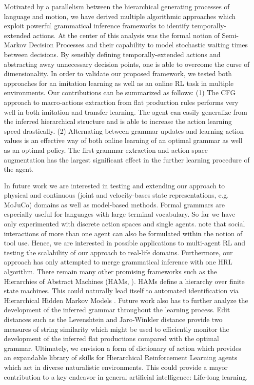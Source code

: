 \documentclass[colorinlistoftodos]{article}
\theoremstyle{definition}
\begin{document}
Motivated by a parallelism between the hierarchical generating processes of language and motion, we have derived multiple algorithmic approaches which exploit powerful grammatical inference frameworks to identify temporally-extended actions. At the center of this analysis was the formal notion of Semi-Markov Decision Processes and their capability to model stochastic waiting times between decisions. By sensibly defining temporally-extended actions and abstracting away unnecessary decision points, one is able to overcome the curse of dimensionality. 
In order to validate our proposed framework, we tested both approaches for an imitation learning as well as an online RL task in multiple environments. Our contributions can be summarized as follows:
%
(1) The CFG approach to macro-actions extraction from flat production rules performs very well in both imitation and transfer learning. The agent can easily generalize from the inferred hierarchical structure and is able to increase the action learning speed drastically.
%
(2) Alternating between grammar updates and learning action values is an effective way of both online learning of an optimal grammar as well as an optimal policy. The first grammar extraction and action space augmentation has the largest significant effect in the further learning procedure of the agent. 

In future work we are interested in testing and extending our approach to physical and continuous (joint and velocity-bases state representations, e.g. MoJuCo) domains as well as model-based methods. Formal grammars are especially useful for languages with large terminal vocabulary. So far we have only experimented with discrete action spaces and single agents. \citet{Pastra_2012} note that social interactions of more than one agent can also be formulated within the notion of tool use. Hence, we are interested in possible applications to multi-agent RL  and testing the scalability of our approach to real-life domains.
%
Furthermore, our approach has only attempted to merge grammatical inference with one HRL algorithm. There remain many other promising frameworks such as the Hierarchies of Abstract Machines (HAMs, \citep{Parr_1998a,Parr_1998b}). HAMs define a hierarchy over finite state machines. This could naturally lead itself to automated identification via Hierarchical Hidden Markov Models \citep{Fine_1998}.
%
Future work also has to further analyze the development of the inferred grammar throughout the learning process. Edit distances such as the Levenshtein and Jaro-Winkler distance provide two measures of string similarity which might be used to efficiently monitor the development of the inferred flat productions compared with the optimal grammar.
%
Ultimately, we envision a form of dictionary of action which provides an expandable library of skills for Hierarchical Reinforcement Learning agents which act in diverse naturalistic environments. This could provide a mayor contribution to a key endeavor in general artificial intelligence: Life-long learning.
\end{document}
